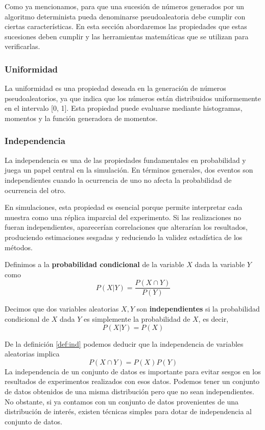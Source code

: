 \documentclass[../Main.tex]{subfiles}
\begin{document}
Como ya mencionamos, para que una sucesión de números generados por un algoritmo determinista pueda denominarse pseudoaleatoria debe cumplir con ciertas características. En esta sección abordaremos las propiedades que estas sucesiones deben cumplir y las herramientas matemáticas que se utilizan para verificarlas. 
\subsubsection{Uniformidad}
La uniformidad es una propiedad deseada en la generación de números pseudoaleatorios, ya que indica que los números están distribuidos uniformemente en el intervalo [0, 1]. Esta propiedad puede evaluarse mediante histogramas, momentos y la función generadora de momentos.

\subsubsection{Independencia}

La independencia es una de las propiedades fundamentales en probabilidad y juega un papel central en la simulación. En términos generales, dos eventos son independientes cuando la ocurrencia de uno no afecta la probabilidad de ocurrencia del otro.  

En simulaciones, esta propiedad es esencial porque permite interpretar cada muestra como una réplica imparcial del experimento. Si las realizaciones no fueran independientes, aparecerían correlaciones que alterarían los resultados, produciendo estimaciones sesgadas y reduciendo la validez estadística de los métodos.  

\begin{definition}
\label{}
    Definimos a la \textbf{probabilidad condicional} de la variable $X$ dada la variable $Y$ como \[P(X|Y)=\frac{P(X\cap Y)}{P(Y)}\]
\end{definition}
\begin{definition}
\label{def:ind}
    Decimos que dos variables aleatorias $X,Y$ son \textbf{independientes} si la probabilidad condicional de $X$ dada $Y$ es simplemente la probabilidad de $X$, es decir, \[P(X|Y)=P(X)\]
\end{definition}

De la definición \ref{def:ind} podemos deducir que la independencia de variables aleatorias implica \[P(X\cap Y)=P(X)P(Y)\]
La independencia de un conjunto de datos es importante para evitar sesgos en los resultados de experimentos realizados con esos datos. Podemos tener un conjunto de datos obtenidos de una misma distribución pero que no sean independientes. No obstante, si ya contamos con un conjunto de datos provenientes de una distribución de interés, existen técnicas simples para dotar de independencia al conjunto de datos. 
\end{document}

